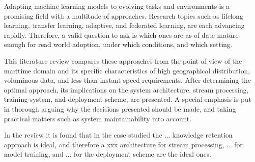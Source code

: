 
Adapting machine learning models to evolving tasks and environments is a promising field with a multitude of approaches. Research topics such as lifelong learning, transfer learning, adaptive, and federated learning, are each advancing rapidly. Therefore, a valid question to ask is which ones are as of date mature enough for read world adoption, under which conditions, and which setting.

This literature review compares these approaches from the point of view of the maritime domain and its specific characteristics of high geographical distribution, voluminous data, and less-than-instant speed requirements. After determining the optimal approach, its implications on the system architecture, stream processing, training system, and deployment scheme, are presented. A special emphasis is put in thorough arguing why the decisions presented should be made, and taking practical matters such as system maintainability into account.

In the review it is found that in the case studied the ... knowledge retention approach is ideal, and therefore a xxx architecture for stream processing,  ... for model training, and ... for the deployment scheme are the ideal ones. %



  


